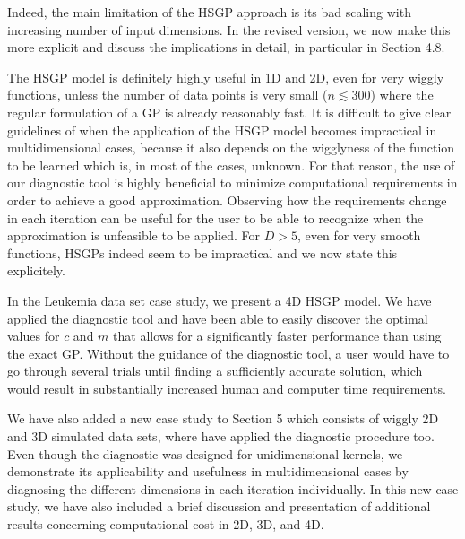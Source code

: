 \documentclass[11pt]{report}
\begin{document}
Indeed, the main limitation of the HSGP approach is its bad scaling with increasing number of input dimensions. In the revised version, we now make this more explicit and discuss the implications in detail, in particular in Section 4.8.

The HSGP model is definitely highly useful in 1D and 2D, even for very wiggly functions, unless the number of data points is very small ($n \lesssim 300$) where the regular formulation of a GP is already reasonably fast. It is difficult to give clear guidelines of when the application of the HSGP model becomes impractical in multidimensional cases, because it also depends on the wigglyness of the function to be learned which is, in most of the cases, unknown. For that reason, the use of our diagnostic tool is highly beneficial to minimize computational requirements in order to achieve a good approximation. Observing how the requirements change in each iteration can be useful for the user to be able to recognize when the approximation is unfeasible to be applied. For $D>5$, even for very smooth functions, HSGPs indeed seem to be impractical and we now state this explicitely.

In the Leukemia data set case study, we present a 4D HSGP model. We have applied the diagnostic tool and have been able to easily discover the optimal values for $c$ and $m$ that allows for a significantly faster performance than using the exact GP. Without the guidance of the diagnostic tool, a user would have to go through several trials until finding a sufficiently accurate solution, which would result in substantially increased human and computer time requirements.

We have also added a new case study to Section 5 which consists of wiggly 2D and 3D simulated data sets, where have applied the diagnostic procedure too. Even though the diagnostic was designed for unidimensional kernels, we demonstrate its applicability and usefulness in multidimensional cases by diagnosing the different dimensions in each iteration individually. 
In this new case study, we have also included a brief discussion and presentation of additional results concerning computational cost in 2D, 3D, and 4D.

\end{document}
